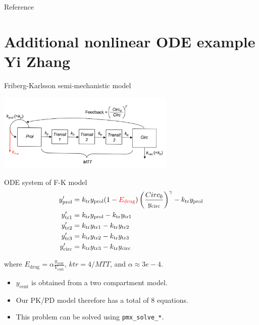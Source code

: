 \documentclass[presentation]{beamer}
\begin{document}
\begin{frame}[label={sec:org5c2c84e}]{Reference}


\end{frame}

\section{Additional nonlinear ODE example \\ \footnotesize{Yi Zhang}}
\label{sec:orga4a7f09}
\begin{frame}[label={sec:orgb6729cf}]{Friberg-Karlsson semi-mechanistic model \cite{Friberg:2002}}
\begin{latex}
\begin{center}
  \includegraphics[width=8.5cm]{Friberg-Karlsson_drug}
\end{center}
\end{latex}
\end{frame}
\begin{frame}[label={sec:orgedcfda5}]{ODE system of F-K model}
\begin{align*}\label{eq:FK}
y_{\mathrm{prol}}' &= k_{\mathrm{tr}} y_{\mathrm{prol}} (1 - {\color{red}E_{\mathrm{drug}}})\left(\frac{Circ_0}
  {y_{\mathrm{circ}}}\right)^\gamma - k_{\mathrm{tr}}y_{\mathrm{prol}} \\
y_{\mathrm{tr1}}' &= k_{\mathrm{tr}} y_{\mathrm{prol}} - k_{\mathrm{tr}} y_{\mathrm{tr1}} \\
y_{\mathrm{tr2}}' &= k_{\mathrm{tr}} y_{\mathrm{tr1}} - k_{\mathrm{tr}} y_{\mathrm{tr2}} \\
y_{\mathrm{tr3}}' &= k_{\mathrm{tr}} y_{\mathrm{tr2}} - k_{\mathrm{tr}} y_{\mathrm{tr3}} \\
y_{\mathrm{circ}}' &= k_{\mathrm{tr}} y_{\mathrm{tr3}} - k_{\mathrm{tr}} y_{\mathrm{circ}} 
\end{align*}

where \(E_\mathrm{drug} = \alpha \frac{y_{\mathrm{cent}}}{V_{\mathrm{cent}}}\),
\(ktr = 4 / MTT\),
and \(\alpha \approx 3e-4\).
\begin{itemize}
\item \(y_\mathrm{cent}\) is obtained from a two compartment model.
\item Our PK/PD model therefore has a total of 8 equations.
\item This problem can be solved using \texttt{pmx\_solve\_*}.
\end{itemize}
\end{frame}
\end{document}
